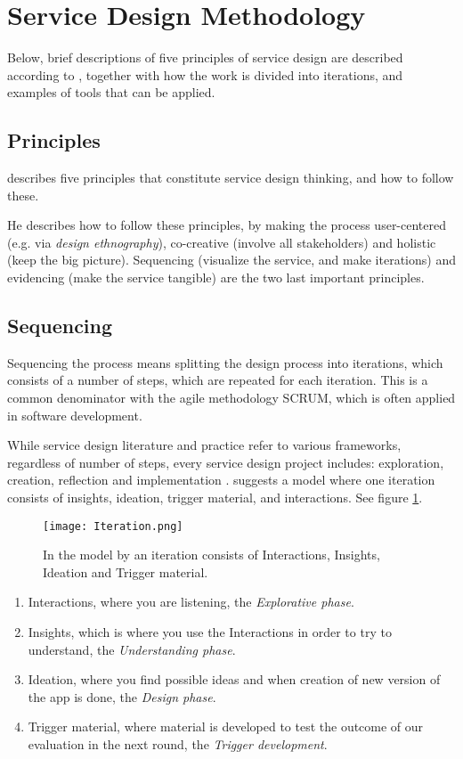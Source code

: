 \section{Service Design Methodology}

Below, brief descriptions of five principles of service design are described according to \cite{stickdorn}, together with how the work is divided into iterations, and examples of tools that can be applied.

\subsection{Principles}
\cite{stickdorn} describes five principles that constitute service design thinking, and how to follow these.

He describes how to follow these principles, by making the process user-centered (e.g. via \textit{design ethnography}), co-creative (involve all stakeholders) and holistic (keep the big picture). Sequencing (visualize the service, and make iterations) and evidencing (make the service tangible) are the two last important principles.

\subsection{Sequencing}
Sequencing the process means splitting the design process into iterations, which consists of a number of steps, which are repeated for each iteration. This is a common denominator with the agile methodology SCRUM, which is often applied in software development.

While service design literature and practice refer to various frameworks, regardless of number of steps, every service design project includes: exploration, creation, reflection and implementation \citep{stickdorn}. \cite{expedition-mondial} suggests a model where one iteration consists of insights, ideation, trigger material, and interactions. See figure \ref{fig:iteration}.

\begin{figure}[h]
    \centering
    \texttt{[image: Iteration.png]}
    \caption{In the model by \cite{nissar} an iteration consists of Interactions, Insights, Ideation and Trigger material.}
    \label{fig:iteration}
\end{figure}

\begin{enumerate}
\item Interactions, where you are listening, the \textit{Explorative phase}.
\item Insights, which is where you use the Interactions in order to try to understand, the \textit{Understanding phase}. %
\item Ideation, where you find possible ideas and when creation of new version of the app is done, the \textit{Design phase}.
\item Trigger material, where material is developed to test the outcome of our evaluation in the next round, the \textit{Trigger development}.
\end{enumerate}

